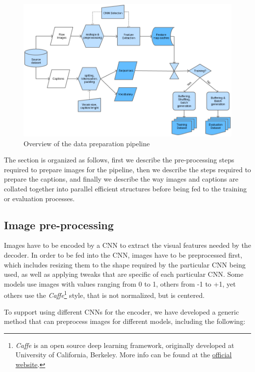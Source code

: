 \begin{figure}[hpt]
	\centering
	\includegraphics[scale=0.5]{images/ch4/data-pipelines.png}
	\caption{Overview of the data preparation pipeline}
	\label{fig:data-pipelines}
\end{figure}

The section is organized as follows, first we describe the pre-processing steps required to prepare images for the pipeline, then we describe the steps required to prepare the captions, and finally we describe the way images and captions are collated together into parallel efficient structures before being fed to the training or evaluation processes.

\subsection{Image pre-processing}

Images have to be encoded by a CNN to extract the visual features needed by the decoder. In order to be fed into the CNN, images have to be preprocessed first, which includes resizing them to the shape required by the particular CNN being used, as well as applying tweaks that are specific of each particular CNN. Some models use images with values ranging from 0 to 1, others from -1 to +1, yet others use the \textit{Caffe}\footnote{\textit{Caffe} is an open source deep learning framework, originally developed at University of California, Berkeley. More info can be found at the \href{http://caffe.berkeleyvision.org/}{official website}.} style, that is not normalized, but is centered. 

To support using different CNNs for the encoder, we have developed a generic method that can preprocess images for different models, including the following:

